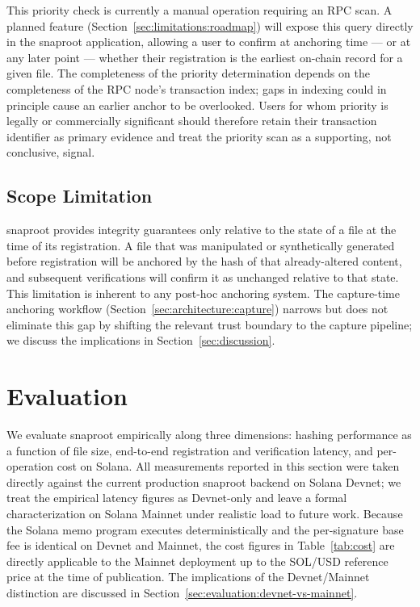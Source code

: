 \documentclass[11pt,a4paper]{article}
\begin{document}
This priority check is currently a manual operation requiring an RPC
scan. A planned feature (Section~\ref{sec:limitations:roadmap})
will expose this query directly in the snaproot application, allowing
a user to confirm at anchoring time --- or at any later point --- whether
their registration is the earliest on-chain record for a given file.
The completeness of the priority determination depends on the
completeness of the RPC node's transaction index; gaps in indexing
could in principle cause an earlier anchor to be overlooked. Users for
whom priority is legally or commercially significant should therefore
retain their transaction identifier as primary evidence and treat the
priority scan as a supporting, not conclusive, signal.

\subsection{Scope Limitation}
\label{sec:security:scope}

snaproot provides integrity guarantees only relative to the state of a
file at the time of its registration. A file that was manipulated or
synthetically generated before registration will be anchored by the
hash of that already-altered content, and subsequent verifications will
confirm it as unchanged relative to that state. This limitation is
inherent to any post-hoc anchoring
system. The capture-time anchoring workflow
(Section~\ref{sec:architecture:capture}) narrows but does not eliminate
this gap by shifting the relevant trust boundary to the capture
pipeline; we discuss the implications in Section~\ref{sec:discussion}.

\section{Evaluation}
\label{sec:evaluation}

We evaluate snaproot empirically along three dimensions: hashing
performance as a function of file size, end-to-end registration and
verification latency, and per-operation cost on Solana. All
measurements reported in this section were taken directly against the
current production snaproot backend on Solana Devnet; we treat the
empirical latency figures as Devnet-only and leave a formal
characterization on Solana Mainnet under realistic load to future
work. Because the Solana memo program executes deterministically and
the per-signature base fee is identical on Devnet and Mainnet, the
cost figures in Table~\ref{tab:cost} are directly applicable to the
Mainnet deployment up to the SOL/USD reference price at the time of
publication. The implications of the Devnet/Mainnet distinction are
discussed in Section~\ref{sec:evaluation:devnet-vs-mainnet}.
\end{document}
